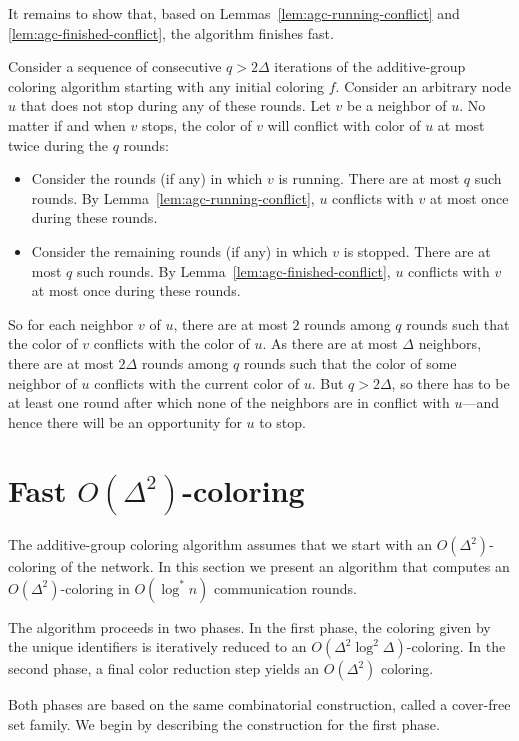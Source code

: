 It remains to show that, based on Lemmas~\ref{lem:agc-running-conflict} and \ref{lem:agc-finished-conflict}, the algorithm finishes fast.

Consider a sequence of consecutive $q > 2\Delta$ iterations of the additive-group coloring algorithm starting with any initial coloring $f$. Consider an arbitrary node $u$ that does not stop during any of these rounds. Let $v$ be a neighbor of $u$. No matter if and when $v$ stops, the color of $v$ will conflict with color of $u$ at most twice during the $q$ rounds:
\begin{itemize}
    \item Consider the rounds (if any) in which $v$ is running. There are at most $q$ such rounds. By Lemma~\ref{lem:agc-running-conflict}, $u$ conflicts with $v$ at most once during these rounds.
    \item Consider the remaining rounds (if any) in which $v$ is stopped. There are at most $q$ such rounds. By Lemma~\ref{lem:agc-finished-conflict}, $u$ conflicts with $v$ at most once during these rounds.
\end{itemize}
So for each neighbor $v$ of $u$, there are at most $2$ rounds among $q$ rounds such that the color of $v$ conflicts with the color of $u$. As there are at most $\Delta$ neighbors, there are at most $2\Delta$ rounds among $q$ rounds such that the color of some neighbor of $u$ conflicts with the current color of $u$. But $q > 2\Delta$, so there has to be at least one round after which none of the neighbors are in conflict with $u$---and hence there will be an opportunity for $u$ to stop.

\section[Fast \texorpdfstring{$O(\Delta^2)$}{O(Δ²)}-coloring]{\boldmath Fast $O(\Delta^2)$-coloring} \label{sec:delta2-coloring}

The additive-group coloring algorithm assumes that we start with an $O(\Delta^2)$-coloring of the network. In this section we present an algorithm that computes an $O(\Delta^2)$-coloring in $O(\log^* n)$ communication rounds.

The algorithm proceeds in two phases. In the first phase, the coloring given by the unique identifiers is iteratively reduced to an $O(\Delta^2 \log^2 \Delta)$-coloring. In the second phase, a final color reduction step yields an $O(\Delta^2)$ coloring.

Both phases are based on the same combinatorial construction, called a cover-free set family. We begin by describing the construction for the first phase.

